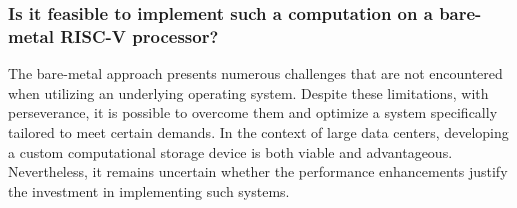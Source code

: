\subsubsection*{Is it feasible to implement such a computation on a bare-metal
RISC-V processor?}
The bare-metal approach presents numerous challenges that are not encountered
when utilizing an underlying operating system. Despite these limitations, with
perseverance, it is possible to overcome them and optimize a system specifically
tailored to meet certain demands. In the context of large data centers,
developing a custom computational storage device is both viable and
advantageous. Nevertheless, it remains uncertain whether the performance
enhancements justify the investment in implementing such systems.


